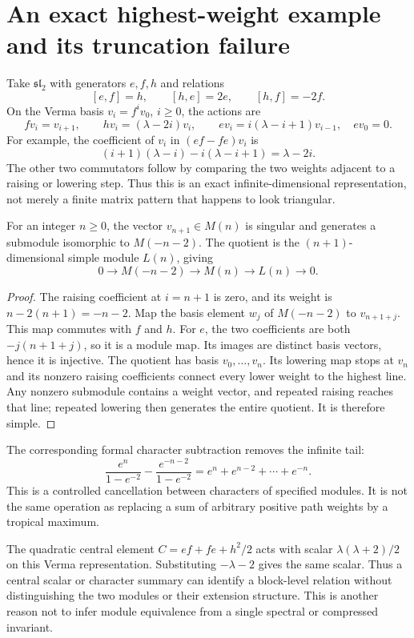 \section{An exact highest-weight example and its truncation failure}
\label{sec:wb-bgg-sl2}

Take $\mathfrak{sl}_2$ with generators $e,f,h$ and relations
\[
 [e,f]=h,\qquad [h,e]=2e,\qquad [h,f]=-2f.
\]
On the Verma basis $v_i=f^iv_0$, $i\ge0$, the actions are
\[
 fv_i=v_{i+1},\qquad hv_i=(\lambda-2i)v_i,\qquad
 ev_i=i(\lambda-i+1)v_{i-1},\quad ev_0=0.
\]
For example, the coefficient of $v_i$ in $(ef-fe)v_i$ is
\[
 (i+1)(\lambda-i)-i(\lambda-i+1)=\lambda-2i.
\]
The other two commutators follow by comparing the two weights adjacent to a raising or lowering step. Thus this is an exact infinite-dimensional representation, not merely a finite matrix pattern that happens to look triangular.

\begin{proposition}
For an integer $n\ge0$, the vector $v_{n+1}\in M(n)$ is singular and generates a submodule isomorphic to $M(-n-2)$. The quotient is the $(n+1)$-dimensional simple module $L(n)$, giving
\[
 0\longrightarrow M(-n-2)\longrightarrow M(n)
 \longrightarrow L(n)\longrightarrow0.
\]
\end{proposition}
\begin{proof}
The raising coefficient at $i=n+1$ is zero, and its weight is $n-2(n+1)=-n-2$. Map the basis element $w_j$ of $M(-n-2)$ to $v_{n+1+j}$. This map commutes with $f$ and $h$. For $e$, the two coefficients are both $-j(n+1+j)$, so it is a module map. Its images are distinct basis vectors, hence it is injective. The quotient has basis $v_0,\ldots,v_n$. Its lowering map stops at $v_n$ and its nonzero raising coefficients connect every lower weight to the highest line. Any nonzero submodule contains a weight vector, and repeated raising reaches that line; repeated lowering then generates the entire quotient. It is therefore simple.
\end{proof}

The corresponding formal character subtraction removes the infinite tail:
\[
 \frac{e^n}{1-e^{-2}}-\frac{e^{-n-2}}{1-e^{-2}}
   =e^n+e^{n-2}+\cdots+e^{-n}.
\]
This is a controlled cancellation between characters of specified modules. It is not the same operation as replacing a sum of arbitrary positive path weights by a tropical maximum.

The quadratic central element $C=ef+fe+h^2/2$ acts with scalar $\lambda(\lambda+2)/2$ on this Verma representation. Substituting $-\lambda-2$ gives the same scalar. Thus a central scalar or character summary can identify a block-level relation without distinguishing the two modules or their extension structure. This is another reason not to infer module equivalence from a single spectral or compressed invariant.

